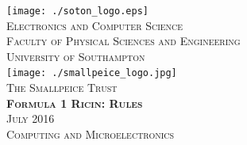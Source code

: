 \documentclass[twoside,12pt,a4paper,titlepage]{article}
\title{\gamename}
\author{\org}
\date{\timeline}
\newcommand{\gamename}{Formula 1 Ricin\xspace}
\newcommand{\timeline}{July 2016\xspace}
\begin{document}
\begin{titlepage}
\begin{center}
\texttt{[image: ./soton\_logo.eps]}~\\[1cm]
\textsc{\large Electronics and Computer Science}\\[0.2cm]
\textsc{\large Faculty of Physical Sciences and Engineering}\\[0.2cm]
\textsc{\large University of Southampton}\\[3.5cm]
\texttt{[image: ./smallpeice\_logo.jpg]}~\\[1cm]
\textsc{\large The Smallpeice Trust}\\[3.5cm]
\textsc{\huge \textbf{\gamename{}: Rules}}\\[1cm]
\textsc{\large \timeline}\\[3cm]
\textsc{\Large Computing and Microelectronics}
\end{center}
\end{titlepage}


\clearpage

\clearpage

\clearpage

\end{document}
